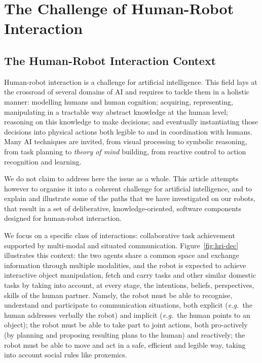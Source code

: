 \documentclass[preprint,3p,times]{elsarticle}
\newcommand{\eg}{{\textit{e.g.\ }}}
\begin{document}

\section{The Challenge of Human-Robot Interaction}

\subsection{The Human-Robot Interaction Context}

Human-robot interaction is a challenge for artificial intelligence. This field
lays at the crossroad of several domains of AI and requires to tackle them in a
holistic manner: modelling humans and human cognition; acquiring, representing,
manipulating in a tractable way abstract knowledge at the human level; reasoning
on this knowledge to make decisions; and eventually instantiating those
decisions into physical actions both legible to and in coordination with humans.
Many AI techniques are invited, from visual processing to symbolic reasoning,
from task planning to \emph{theory of mind} building, from reactive control to
action recognition and learning.

We do not claim to address here the issue as a whole. This article attempts
however to organise it into a coherent challenge for artificial intelligence,
and to explain and illustrate some of the paths that we have investigated on our
robots, that result in a set of deliberative, knowledge-oriented, software
components designed for human-robot interaction.

We focus on a specific class of interactions: collaborative task achievement
supported by multi-modal and situated communication. Figure~\ref{fig:hri-dec}
illustrates this context: the two agents share a common space and exchange
information through multiple modalities, and the robot is expected to achieve
interactive object manipulation, fetch and carry tasks and other similar
domestic tasks by taking into account, at every stage, the intentions, beliefs,
perspectives, skills of the human partner.  Namely, the robot must be able to
recognise, understand and participate to communication situations, both explicit
(\eg the human addresses verbally the robot) and implicit (\eg the human points
to an object); the robot must be able to take part to joint actions, both
pro-actively (by planning and proposing resulting plans to the human) and
reactively; the robot must be able to move and act in a safe, efficient and
legible way, taking into account social rules like proxemics.
\end{document}
